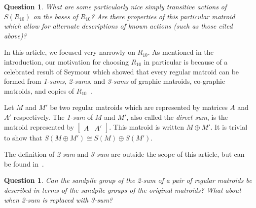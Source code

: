 \documentclass[12p]{amsart}
\numberwithin{equation}{section}
\theoremstyle{plain}
\newtheorem{open}[thm]{Question}
\theoremstyle{definition}
\begin{document}
\begin{open}
    What are some particularly nice simply transitive actions of $S(R_{10})$ on the bases of $R_{10}$? Are there properties of this particular matroid which allow for alternate descriptions of known actions (such as those cited above)? 
\end{open}

In this article, we focused very narrowly on $R_{10}$. As mentioned in the introduction, our motivation for choosing $R_{10}$ in particular is because of a celebrated result of Seymour which showed that every regular matroid can be formed from \emph{1-sums}, \emph{2-sums}, and \emph{3-sums} of graphic matroids, co-graphic matroids, and copies of $R_{10}$~\cite{Seymour}.

Let $M$ and $M'$ be two regular matroids which are represented by matrices $A$ and $A'$ respectively. The \emph{1-sum} of $M$ and $M'$, also called the \emph{direct sum}, is the matroid represented by $\begin{bmatrix}A &  A'\end{bmatrix}$. This matroid is written $M \oplus M'$. It is trivial to show that $S(M \oplus M')\cong S(M) \oplus S(M')$. 

The definition of \emph{2-sum} and \emph{3-sum} are outside the scope of this article, but can be found in~\cite{Oxley}. 

\begin{open}
    Can the sandpile group of the 2-sum of a pair of regular matroids be described in terms of the sandpile groups of the original matroids? What about when 2-sum is replaced with 3-sum? 
\end{open}






\end{document}
